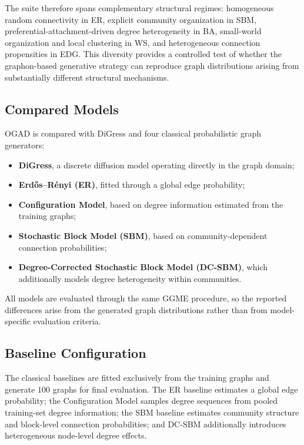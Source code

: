 The suite therefore spans complementary structural regimes: homogeneous random connectivity in ER, explicit community organization in SBM, preferential-attachment-driven degree heterogeneity in BA, small-world organization and local clustering in WS, and heterogeneous connection propensities in EDG.
This diversity provides a controlled test of whether the graphon-based generative strategy can reproduce graph distributions arising from substantially different structural mechanisms.

\subsection{Compared Models}
\label{subsec:exp_models}

OGAD is compared with DiGress and four classical probabilistic graph generators:

\begin{itemize}
    \item \textbf{DiGress}, a discrete diffusion model operating directly in the graph domain;
    \item \textbf{Erd\H{o}s--R\'enyi (ER)}, fitted through a global edge probability;
    \item \textbf{Configuration Model}, based on degree information estimated from the training graphs;
    \item \textbf{Stochastic Block Model (SBM)}, based on community-dependent connection probabilities;
    \item \textbf{Degree-Corrected Stochastic Block Model (DC-SBM)}, which additionally models degree heterogeneity within communities.
\end{itemize}

All models are evaluated through the same GGME procedure, so the reported differences arise from the generated graph distributions rather than from model-specific evaluation criteria.


\subsection{Baseline Configuration}
\label{subsec:exp_baseline_configuration}

The classical baselines are fitted exclusively from the training graphs and generate \(100\) graphs for final evaluation. The ER baseline estimates a global edge probability; the Configuration Model samples degree sequences from pooled training-set degree information; the SBM baseline estimates community structure and block-level connection probabilities; and DC-SBM additionally introduces heterogeneous node-level degree effects.

